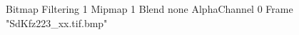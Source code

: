 {Bitmap
	{Filtering 1}
	{Mipmap 1}
	{Blend none}
	{AlphaChannel 0}
	{Frame "SdKfz223_xx.tif.bmp"}
}
